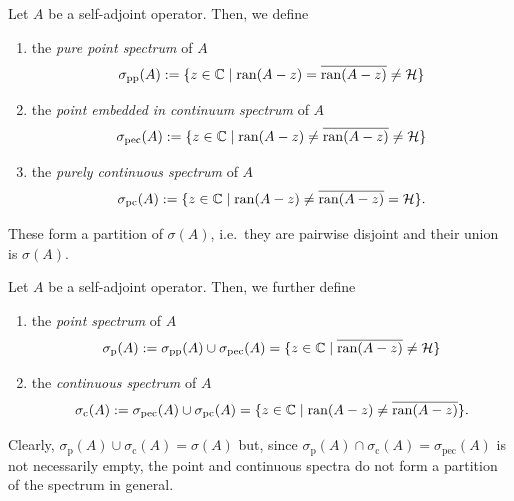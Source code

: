 \begin{definition}
Let $A$ be a self-adjoint operator. Then, we define
\begin{enumerate}[label=(\roman*)]
\item the \emph{pure point spectrum} of $A$
\begin{equation*}
\sigma_{\mathrm{pp}}(A) := \{z\in\mathbb{C}\mid \operatorname{ran}(A-z)=\overline{\operatorname{ran}(A-z)}\neq\mathcal{H}\}
\end{equation*}
\item the \emph{point embedded in continuum spectrum} of $A$
\begin{equation*}
\sigma_{\mathrm{pec}}(A) := \{z\in\mathbb{C}\mid \operatorname{ran}(A-z)\neq\overline{\operatorname{ran}(A-z)}\neq\mathcal{H}\}
\end{equation*}
\item the \emph{purely continuous spectrum} of $A$
\begin{equation*}
\sigma_{\mathrm{pc}}(A) := \{z\in\mathbb{C}\mid \operatorname{ran}(A-z)\neq\overline{\operatorname{ran}(A-z)}=\mathcal{H}\}.
\end{equation*}
\end{enumerate}
\end{definition}
These form a partition of $\sigma(A)$, i.e.\ they are pairwise disjoint and their union is $\sigma(A)$.
\begin{definition}
Let $A$ be a self-adjoint operator. Then, we further define
\begin{enumerate}[label=(\roman*)]
\item the \emph{point spectrum} of $A$
\begin{equation*}
\sigma_{\mathrm{p}}(A) := \sigma_{\mathrm{pp}}(A)\cup \sigma_{\mathrm{pec}}(A) = \{z\in\mathbb{C}\mid \overline{\operatorname{ran}(A-z)}\neq\mathcal{H}\}
\end{equation*}
\item the \emph{continuous spectrum} of $A$
\begin{equation*}
\sigma_{\mathrm{c}}(A) :=  \sigma_{\mathrm{pec}}(A)\cup  \sigma_{\mathrm{pc}}(A)=\{z\in\mathbb{C}\mid \operatorname{ran}(A-z)\neq\overline{\operatorname{ran}(A-z)}\}.
\end{equation*}
\end{enumerate}
\end{definition}
Clearly, $\sigma_{\mathrm{p}}(A) \cup\sigma_{\mathrm{c}}(A) =\sigma(A)$ but, since $\sigma_{\mathrm{p}}(A) \cap\sigma_{\mathrm{c}}(A) = \sigma_{\mathrm{pec}}(A)$ is not necessarily empty, the point and continuous spectra do not form a partition of the spectrum in general.

